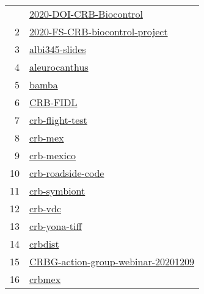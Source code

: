 \begin{longtable}{rl}
\bottomrule
\endlastfoot
 1 &                           \href{https://github.com/aubreymoore/2020-DOI-CRB-Biocontrol}{2020-DOI-CRB-Biocontrol} \\
 2 &             \href{https://github.com/aubreymoore/2020-FS-CRB-biocontrol-project}{2020-FS-CRB-biocontrol-project} \\
 3 &                                             \href{https://github.com/aubreymoore/albi345-slides}{albi345-slides} \\
 4 &                                               \href{https://github.com/aubreymoore/aleurocanthus}{aleurocanthus} \\
 5 &                                                               \href{https://github.com/aubreymoore/bamba}{bamba} \\
 6 &                                                         \href{https://github.com/aubreymoore/CRB-FIDL}{CRB-FIDL} \\
 7 &                                           \href{https://github.com/aubreymoore/crb-flight-test}{crb-flight-test} \\
 8 &                                                           \href{https://github.com/aubreymoore/crb-mex}{crb-mex} \\
 9 &                                                     \href{https://github.com/aubreymoore/crb-mexico}{crb-mexico} \\
10 &                                       \href{https://github.com/aubreymoore/crb-roadside-code}{crb-roadside-code} \\
11 &                                                 \href{https://github.com/aubreymoore/crb-symbiont}{crb-symbiont} \\
12 &                                                           \href{https://github.com/aubreymoore/crb-vdc}{crb-vdc} \\
13 &                                               \href{https://github.com/aubreymoore/crb-yona-tiff}{crb-yona-tiff} \\
14 &                                                           \href{https://github.com/aubreymoore/crbdist}{crbdist} \\
15 &     \href{https://github.com/aubreymoore/CRBG-action-group-webinar-20201209}{CRBG-action-group-webinar-20201209} \\
16 &                                                             \href{https://github.com/aubreymoore/crbmex}{crbmex} \\

\end{longtable}
